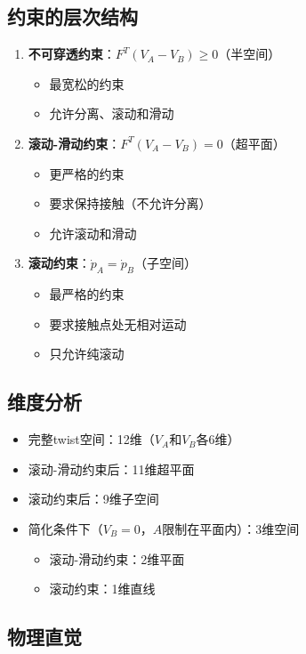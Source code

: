\documentclass[12pt,a4paper]{article}
\begin{document}
\subsection{约束的层次结构}

\begin{enumerate}
\item \textbf{不可穿透约束}：$F^T (V_A - V_B) \geq 0$（半空间）
  \begin{itemize}
  \item 最宽松的约束
  \item 允许分离、滚动和滑动
  \end{itemize}

\item \textbf{滚动-滑动约束}：$F^T (V_A - V_B) = 0$（超平面）
  \begin{itemize}
  \item 更严格的约束
  \item 要求保持接触（不允许分离）
  \item 允许滚动和滑动
  \end{itemize}

\item \textbf{滚动约束}：$\dot{p}_A = \dot{p}_B$（子空间）
  \begin{itemize}
  \item 最严格的约束
  \item 要求接触点处无相对运动
  \item 只允许纯滚动
  \end{itemize}
\end{enumerate}

\subsection{维度分析}

\begin{itemize}
\item 完整twist空间：12维（$V_A$和$V_B$各6维）
\item 滚动-滑动约束后：11维超平面
\item 滚动约束后：9维子空间
\item 简化条件下（$V_B = 0$，$A$限制在平面内）：3维空间
  \begin{itemize}
  \item 滚动-滑动约束：2维平面
  \item 滚动约束：1维直线
  \end{itemize}
\end{itemize}

\subsection{物理直觉}
\end{document}
